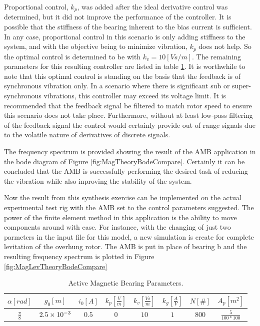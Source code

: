  Proportional control, $ k_p $, was added after the ideal derivative control was determined, but it did not improve the performance of the controller. It is possible that the stiffness of the bearing inherent to the bias current is sufficient. In any case, proportional control in this scenario is only adding stiffness to the system, and with the objective being to minimize vibration, $ k_p $ does not help. So the optimal control is determined to be with $ k_v=10[Vs/m] $. The remaining parameters for this resulting controller are listed in table \ref{tab:MagBearingParameters}. It is worthwhile to note that this optimal control is standing on the basis that the feedback is of synchronous vibration only. In a scenario where there is significant sub or super-synchronous vibrations, this controller may exceed its voltage limit. It is recommended that the feedback signal be filtered to match rotor speed to ensure this scenario does not take place. Furthermore, without at least low-pass filtering of the feedback signal the control would certainly provide out of range signals due to the volatile nature of derivatives of discrete signals.\par 
 The frequency spectrum is provided showing the result of the AMB application in the bode diagram of Figure \ref{fig:MagTheoryBodeCompare}. Certainly it can be concluded that the AMB is successfully performing the desired task of reducing the vibration while also inproving the stability of the system.\par 
 Now the result from this synthesis exercise can be implemented on the actual experimental test rig with the AMB set to the control parameters suggested. The power of the finite element method in this application is the ability to move components around with ease. For instance, with the changing of just two parmeters in the input file for this model, a new simulation is create for complete levitation of the overhung rotor. The AMB is put in place of bearing b and the resulting frequency spectrum is plotted in Figure \ref{fig:MagLevTheoryBodeCompare}
\begin{table}
	\centering
	\caption{Active Magnetic Bearing Parameters.}
	\begin{tabular}{cccccccc}
		$\alpha[rad]$&$g_0[m]$&$i_0[A]$&$k_p[\frac{V}{m}]$&$k_v[\frac{Vs}{m}]$&$k_g[\frac{A}{V}]$&$ N[\#]$&$A_p[m^2]$\\\hline
		$\frac{\pi}{8}$&$2.5\times 10^{-3}$&$0.5$&$0$&$10$&$1$&$800$&$\frac{5}{100*100}$
	\end{tabular}
	\label{tab:MagBearingParameters}
\end{table}
